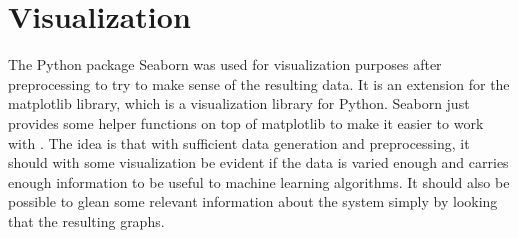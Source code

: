 \section*{Visualization}
The Python package Seaborn was used for visualization purposes after preprocessing to try to make sense of the resulting data. It is an extension for the matplotlib library, which is a visualization library for Python. Seaborn just provides some helper functions on top of matplotlib to make it easier to work with \cite*{Waskom2021}.
The idea is that with sufficient data generation and preprocessing, it should with some visualization be evident if the data is varied enough and carries enough information to be useful to machine learning algorithms.
It should also be possible to glean some relevant information about the system simply by looking that the resulting graphs.
